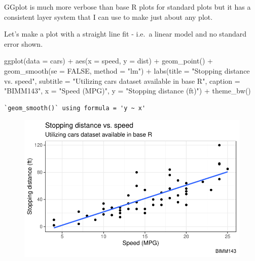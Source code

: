 \documentclass[
  letterpaper,
  DIV=11,
  numbers=noendperiod]{scrartcl}
\newenvironment{Shaded}{\begin{snugshade}}{\end{snugshade}}
\newcommand{\AttributeTok}[1]{\textcolor[rgb]{0.40,0.45,0.13}{#1}}
\newcommand{\ConstantTok}[1]{\textcolor[rgb]{0.56,0.35,0.01}{#1}}
\newcommand{\FunctionTok}[1]{\textcolor[rgb]{0.28,0.35,0.67}{#1}}
\newcommand{\NormalTok}[1]{\textcolor[rgb]{0.00,0.23,0.31}{#1}}
\newcommand{\SpecialCharTok}[1]{\textcolor[rgb]{0.37,0.37,0.37}{#1}}
\newcommand{\StringTok}[1]{\textcolor[rgb]{0.13,0.47,0.30}{#1}}
\begin{document}
GGplot is much more verbose than base R plots for standard plots but it
has a consistent layer system that I can use to make just about any
plot.

Let's make a plot with a straight line fit - i.e.~a linear model and no
standard error shown.

\begin{Shaded}
\begin{Highlighting}[]
\FunctionTok{ggplot}\NormalTok{(}\AttributeTok{data =}\NormalTok{ cars) }\SpecialCharTok{+}
  \FunctionTok{aes}\NormalTok{(}\AttributeTok{x =}\NormalTok{ speed, }\AttributeTok{y =}\NormalTok{ dist) }\SpecialCharTok{+}
  \FunctionTok{geom\_point}\NormalTok{() }\SpecialCharTok{+} 
  \FunctionTok{geom\_smooth}\NormalTok{(}\AttributeTok{se =} \ConstantTok{FALSE}\NormalTok{, }\AttributeTok{method =} \StringTok{"lm"}\NormalTok{) }\SpecialCharTok{+}
  \FunctionTok{labs}\NormalTok{(}\AttributeTok{title =} \StringTok{"Stopping distance vs. speed"}\NormalTok{,}
       \AttributeTok{subtitle =} \StringTok{"Utilizing cars dataset available in base R"}\NormalTok{,}
       \AttributeTok{caption =} \StringTok{"BIMM143"}\NormalTok{,}
       \AttributeTok{x =} \StringTok{"Speed (MPG)"}\NormalTok{,}
       \AttributeTok{y =} \StringTok{"Stopping distance (ft)"}\NormalTok{) }\SpecialCharTok{+}
  \FunctionTok{theme\_bw}\NormalTok{()}
\end{Highlighting}
\end{Shaded}

\begin{verbatim}
`geom_smooth()` using formula = 'y ~ x'
\end{verbatim}

\begin{figure}[H]

{\centering \includegraphics{class05_files/figure-pdf/unnamed-chunk-6-1.pdf}

}

\end{figure}
\end{document}
